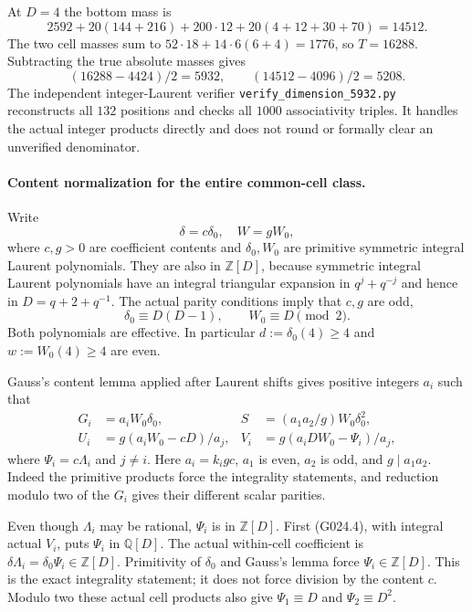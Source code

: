 At $D=4$ the bottom mass is
\[
 2592+20(144+216)+200\cdot12+20(4+12+30+70)=14512.
\]
The two cell masses sum to
$52\cdot18+14\cdot6(6+4)=1776$, so $T=16288$.
Subtracting the true absolute masses gives
\[
 (16288-4424)/2=5932,\qquad (14512-4096)/2=5208.
 \tag{G024.3}
\]
The independent integer-Laurent verifier
\texttt{verify\_dimension\_5932.py} reconstructs all $132$
positions and checks all $1000$ associativity triples. It
handles the actual integer products directly and does not
round or formally clear an unverified denominator.

\paragraph{Content normalization for the entire common-cell class.}
Write
\[
 \delta=c\delta_0,\quad W=gW_0,
\]
where $c,g>0$ are coefficient contents and $\delta_0,W_0$
are primitive symmetric integral Laurent polynomials.
They are also in $\mathbb Z[D]$, because symmetric integral
Laurent polynomials have an integral triangular expansion
in $q^j+q^{-j}$ and hence in $D=q+2+q^{-1}$.
The actual parity conditions imply that $c,g$ are odd,
\[
 \delta_0\equiv D(D-1),\qquad W_0\equiv D\pmod2.
\]
Both polynomials are effective. In particular
$d:=\delta_0(4)\ge4$ and $w:=W_0(4)\ge4$ are even.

Gauss's content lemma applied after Laurent shifts gives
positive integers $a_i$ such that
\[
 \begin{aligned}
 G_i&=a_iW_0\delta_0,&
 S&=(a_1a_2/g)W_0\delta_0^2,\\
 U_i&=g(a_iW_0-cD)/a_j,&
 V_i&=g(a_iDW_0-\Psi_i)/a_j,
 \end{aligned}                                                     \tag{G024.4}
\]
where $\Psi_i=c\Lambda_i$ and $j\ne i$.
Here $a_i=k_i g c$, $a_1$ is even, $a_2$ is odd, and
$g\mid a_1a_2$. Indeed the primitive products force the
integrality statements, and reduction modulo two of the
$G_i$ gives their different scalar parities.

Even though $\Lambda_i$ may be rational, $\Psi_i$ is in
$\mathbb Z[D]$. First (G024.4), with integral actual $V_i$,
puts $\Psi_i$ in $\mathbb Q[D]$. The actual within-cell
coefficient is $\delta\Lambda_i=\delta_0\Psi_i\in\mathbb Z[D]$.
Primitivity of $\delta_0$ and Gauss's lemma force
$\Psi_i\in\mathbb Z[D]$. This is the exact integrality
statement; it does not force division by the content $c$.
Modulo two these actual cell products also give
$\Psi_1\equiv D$ and $\Psi_2\equiv D^2$.

